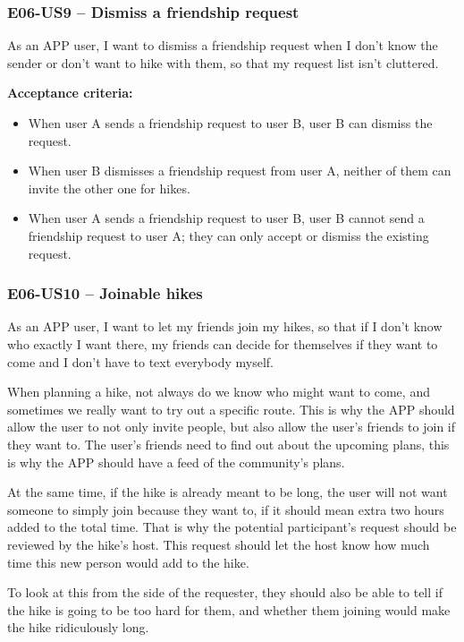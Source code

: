 \subsubsection*{E06-US9 -- Dismiss a friendship request}
As an APP user, I want to dismiss a friendship request when I don't know the sender or don't want to hike with them, so that my request list isn't cluttered.

\textbf{Acceptance criteria:} 
\begin{itemize}
    \item When user A sends a friendship request to user B, user B can dismiss the request.
    \item When user B dismisses a friendship request from user A, neither of them can invite the other one for hikes.
    \item When user A sends a friendship request to user B, user B cannot send a friendship request to user A; they can only accept or dismiss the existing request.
\end{itemize}



\subsubsection*{E06-US10 -- Joinable hikes}
As an APP user, I want to let my friends join my hikes, so that if I don't know who exactly I want there, my friends can decide for themselves if they want to come and I don't have to text everybody myself.

When planning a hike, not always do we know who might want to come, and sometimes we really want to try out a specific route.
This is why the APP should allow the user to not only invite people, but also allow the user's friends to join if they want to.
The user's friends need to find out about the upcoming plans, this is why the APP should have a feed of the community's plans.

At the same time, if the hike is already meant to be long, the user will not want someone to simply join because they want to, if it should mean extra two hours added to the total time.
That is why the potential participant's request should be reviewed by the hike's host.
This request should let the host know how much time this new person would add to the hike.

To look at this from the side of the requester, they should also be able to tell if the hike is going to be too hard for them, and whether them joining would make the hike ridiculously long.

